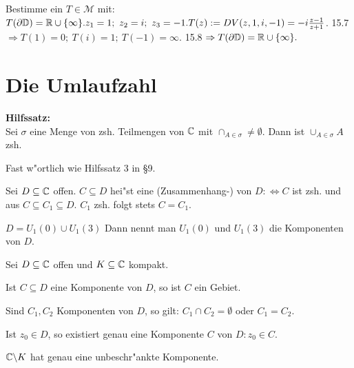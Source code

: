\documentclass[a4paper,twoside,DIV15,BCOR12mm]{scrbook}
\begin{document}
\begin{beispiel}
Bestimme ein $T \in \mathcal{M}$ mit: $T(\partial \mathbb{D}) = \mathbb{R} \cup \{ \infty \}. z_1 = 1; \ z_2=i; \ z_3 = -1. T(z) := DV(z,1,i,-1) = -i\frac{z-1}{z+1}$. 15.7 $\Rightarrow T(1) = 0; \ T(i) = 1; \ T(-1) = \infty.$ 15.8 $\Rightarrow T(\partial \mathbb{D}) = \mathbb{R} \cup \{ \infty \}.$
\end{beispiel}


\chapter{Die Umlaufzahl}
{\bf Hilfssatz:}\\
Sei $\sigma$ eine Menge von zsh. Teilmengen von $\mathbb{C}$ mit $\cap_{A \in \sigma} \not= \emptyset$. Dann ist $\cup_{A \in \sigma} A$ zsh.

\begin{beweis}
Fast w"ortlich wie Hilfssatz 3 in §9.
\end{beweis}

\begin{definition}
Sei $D \subseteq \mathbb{C}$ offen. $C \subseteq D$ hei"st eine (Zusammenhang-) von $D :\Leftrightarrow C$ ist zsh. und aus $C \subseteq C_1 \subseteq D$. $C_1$ zsh. folgt stets $C=C_1$.
\end{definition}

\begin{beispiel}
$D = U_1(0) \cup U_1(3)$ Dann nennt man $U_1(0)$ und $U_1(3)$ die Komponenten von $D$.
\end{beispiel}

\begin{satz}
Sei $D \subseteq \mathbb{C}$ offen und $K \subseteq \mathbb{C}$ kompakt.
\begin{liste}
\item Ist $C \subseteq D$ eine Komponente von $D$, so ist $C$ ein Gebiet.
\item Sind $C_1,C_2$ Komponenten von $D$, so gilt: $C_1 \cap C_2 = \emptyset$ oder $C_1 = C_2$.
\item Ist $z_0 \in D$, so  existiert genau eine Komponente $C$ von $D: z_0 \in C$.
\item $\mathbb{C} \backslash K$ hat genau eine unbeschr"ankte Komponente.
\end{liste}
\end{satz}
\end{document}
